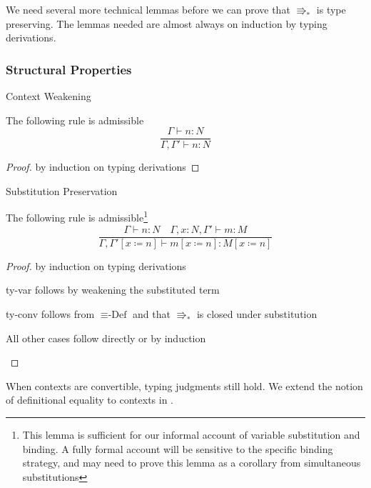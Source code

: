 We need several more technical lemmas before we can prove that $\Rrightarrow_{\ast}$ is type preserving.
The lemmas needed are almost always on induction by typing derivations.

\subsubsection{Structural Properties}

\begin{thm}
Context Weakening

The following rule is admissible
\[
\frac{\Gamma\vdash n:N}{\Gamma,\Gamma'\vdash n:N}
\]
\end{thm}

\begin{proof}
by induction on typing derivations
\end{proof}
\begin{lem}
Substitution Preservation

The following rule is admissible\footnote{
  This lemma is sufficient for our informal account of variable substitution and binding.
  A fully formal account will be sensitive to the specific binding strategy, and may need to prove this lemma as a corollary from simultaneous substitutions}
\[
\frac{\Gamma\vdash n:N\quad\Gamma,x:N,\Gamma'\vdash m:M}{\Gamma,\Gamma'\left[x\coloneqq n\right]\vdash m\left[x\coloneqq n\right]:M\left[x\coloneqq n\right]}
\]
\end{lem}

\begin{proof}
by induction on typing derivations

\begin{casenv}
  \item \textrm{ty-var} follows by weakening the substituted term
  \item \textrm{ty-conv} follows from $\equiv\textrm{-Def}$ and that $\Rrightarrow_{\ast}$ is closed under substitution
  \item All other cases follow directly or by induction
\end{casenv}
\end{proof}
When contexts are convertible, typing judgments still hold.
We extend the notion of definitional equality to contexts in .

